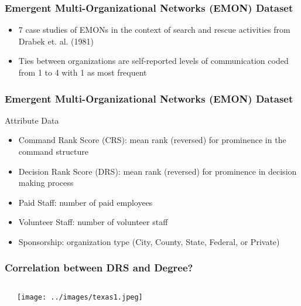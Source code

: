 \documentclass{beamer}
\begin{document}
\begin{frame}
\frametitle{Emergent Multi-Organizational Networks (EMON) Dataset}
\begin{itemize}
\item 7 case studies of EMONs in the context of search and rescue activities from Drabek et. al. (1981)
\pause
\item Ties between organizations are self-reported levels of communication coded from 1 to 4 with 1 as most frequent
\end{itemize}
\end{frame}

\begin{frame}
\frametitle{Emergent Multi-Organizational Networks (EMON) Dataset}
Attribute Data
\begin{itemize}
\item Command Rank Score (CRS): mean rank (reversed) for prominence in the command structure
\item Decision Rank Score (DRS): mean rank (reversed) for prominence in decision making process
\item Paid Staff: number of paid employees
\item Volunteer Staff: number of volunteer staff
\item Sponsorship: organization type (City, County, State, Federal, or Private) 
\end{itemize}
\end{frame}



\begin{frame}
\frametitle{Correlation between DRS and Degree?}
\begin{columns}
\column{5cm}
\begin{itemize}
\end{itemize}
\column{5cm}
\texttt{[image: ../images/texas1.jpeg]}
\end{columns}
\end{frame}


\end{document}
